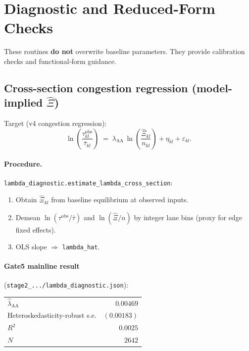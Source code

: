 \documentclass[11pt]{article}
\newcommand{\obs}{\mathrm{obs}}
\newcommand{\AAcal}{\mathrm{AA}}
\begin{document}
\section{Diagnostic and Reduced-Form Checks}\label{sec:diagnostic}

These routines \textbf{do not} overwrite baseline parameters.  They
provide calibration checks and functional-form guidance.

\subsection{Cross-section congestion regression (model-implied $\hat\Xi$)}

Target (v4 congestion regression):
\begin{equation}\label{eq:lambda_regression}
  \ln\!\left(\frac{\tau^{\obs}_{kl}}{\bar\tau_{kl}}\right)
  \;=\;
  \lambda_{\AAcal}\,
  \ln\!\left(\frac{\hat\Xi_{kl}}{n_{kl}}\right)
  + \eta_{kl} + \varepsilon_{kl}.
\end{equation}

\paragraph{Procedure.}
\texttt{lambda\_diagnostic.estimate\_lambda\_cross\_section}:
\begin{enumerate}[leftmargin=2em]
  \item Obtain $\hat\Xi_{kl}$ from baseline equilibrium at observed
        inputs.
  \item Demean $\ln(\tau^{\obs}/\bar\tau)$ and $\ln(\hat\Xi/n)$ by
        integer lane bins (proxy for edge fixed effects).
  \item OLS slope $\Rightarrow$ \texttt{lambda\_hat}.
\end{enumerate}

\paragraph{Gate5 mainline result}
(\texttt{stage2\_.../lambda\_diagnostic.json}):
\begin{center}
\begin{tabular}{@{}lr@{}}
\toprule
$\hat\lambda_{\AAcal}$ & $0.00469$ \\
Heteroskedasticity-robust s.e. & $(0.00183)$ \\
$R^2$ & $0.0025$ \\
$N$ & $2642$ \\
\bottomrule
\end{tabular}
\end{center}
\end{document}
